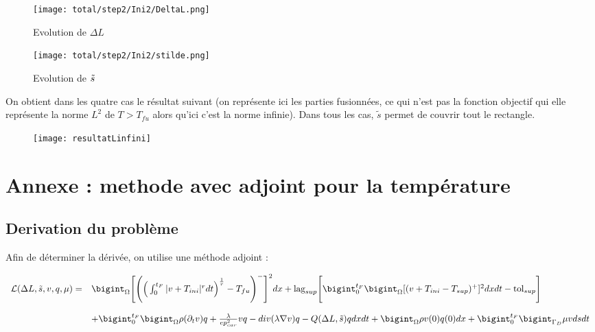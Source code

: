 \documentclass[11pt,a4paper]{article}
\begin{document}
\begin{itemize}
\begin{itemize}
		\begin{figure}[H]
			\begin{minipage}{0.45\textwidth}
				\centering
				\texttt{[image: total/step2/Ini2/DeltaL.png]}
				\caption{Evolution de $\Delta L$}
			\end{minipage}
			\begin{minipage}{0.45\textwidth}
				\centering
				\texttt{[image: total/step2/Ini2/stilde.png]}
				\caption{Evolution de $\tilde{s}$}
			\end{minipage}
		\end{figure}
		
	\end{itemize}
\end{itemize}

On obtient dans les quatre cas le résultat suivant (on représente ici les parties fusionnées, ce qui n'est pas la fonction objectif qui elle représente la norme $L^2$ de $T>T_{fu}$ alors qu'ici c'est la norme infinie). Dans tous les cas, $\tilde{s}$ permet de couvrir tout le rectangle.

\begin{figure}[H]
	\centering
	\texttt{[image: resultatLinfini]}
\end{figure}




\section*{Annexe : methode avec adjoint pour la température}

\subsection*{Derivation du problème}

Afin de déterminer la dérivée, on utilise une méthode adjoint :

\begin{equation}
\begin{array}{ll}
\mathcal{L}(\Delta L,\tilde{s},v,q,\mu)= & \bigint_{\Omega}\Bigg[\Bigg(\Big(\int_{0}^{t_F}|v+T_{ini}|^rdt\Big)^{\frac{1}{r}}-T_{fu}\Bigg)^-\Bigg]^2dx +\textrm{lag}_{sup} \Bigg[\bigint_{0}^{t_F}\bigint_{\Omega}[(v+T_{ini}-T_{sup})^+]^2dxdt-\textrm{tol}_{sup}\Bigg] \\
\\
\, & + \bigint_{0}^{t_F}\bigint_{\Omega}\rho(\partial_t v)q+\frac{\lambda}{ep_{car}^2} vq-div(\lambda\nabla v)q-Q(\Delta L,\tilde{s})q dxdt +\bigint_{\Omega}\rho v(0)q(0) dx+\bigint_{0}^{t_F}\bigint_{\Gamma_D}\mu v dsdt\\
\end{array}
\end{equation}
\end{document}
